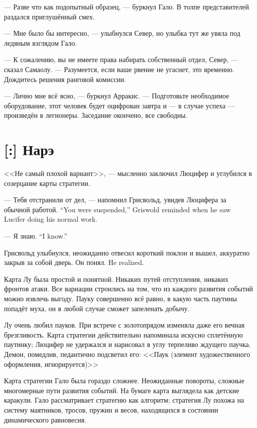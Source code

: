 --- Разве что как подопытный образец, --- буркнул Гало.
В толпе представителей раздался приглушённый смех.

--- Мне было бы интересно, --- улыбнулся Север, но улыбка тут же увяла под ледяным взглядом Гало.

--- К сожалению, вы не имеете права набирать собственный отдел, Север, --- сказал Самаолу.
--- Разумеется, если ваше рвение не угаснет, это временно.
Дождитесь решения ранговой комиссии.

--- Лично мне всё ясно, --- буркнул Арракис.
--- Подготовьте необходимое оборудование, этот человек будет оцифрован завтра и --- в случае успеха --- произведён в легионеры.
Заседание окончено, все свободны.

\section{[:] Нарэ}

<<Не самый плохой вариант>>, --- мысленно заключил Люцифер и углубился в созерцание карты стратегии.

{--- Тебя отстранили от дел, --- напомнил Грисвольд, увидев Люцифера за обычной работой.}
{``You were suspended,'' Griswold reminded when he saw Lucifer doing his normal work.}

{--- Я знаю.}
{``I know.''}

Грисвольд улыбнулся, неожиданно отвесил короткий поклон и вышел, аккуратно закрыв за собой дверь.
{Он понял.}
{He realized.}

Карта Лу была простой и понятной.
Никаких путей отступления, никаких фронтов атаки.
Все вариации строились на том, что из каждого развития событий можно извлечь выгоду.
Пауку совершенно всё равно, в какую часть паутины попадёт муха, он в любой случае сможет запеленать добычу.

Лу очень любил пауков.
При встрече с золотопрядом изменяла даже его вечная брезгливость.
Карта стратегии действительно напоминала искусно сплетённую паутинку;
Люцифер не удержался и нарисовал в углу терпеливо ждущего паучка.
Демон, помедлив, педантично подсветил его:
<<Паук (элемент художественного оформления, игнорируется)>>

Карта стратегии Гало была гораздо сложнее.
Неожиданные повороты, сложные многомерные пути развития событий.
На бумаге карта выглядела как детские каракули.
Гало рассматривает стратегию как алгоритм;
стратегия Лу похожа на систему маятников, тросов, пружин и весов, находящихся в состоянии динамического равновесия.

